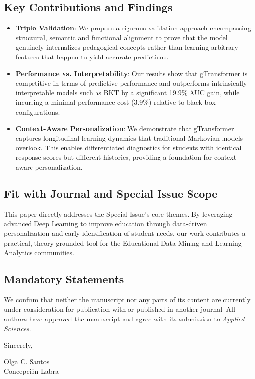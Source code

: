 \documentclass[10pt]{article}
\begin{document}
\subsection*{Key Contributions and Findings}
\begin{itemize}[leftmargin=*, label=$\bullet$, itemsep=0pt, topsep=2pt]
    \item \textbf{Triple Validation}: We propose a rigorous validation approach encompassing structural, semantic and functional alignment to prove that the model genuinely internalizes pedagogical concepts rather than learning arbitrary features that happen to yield accurate predictions.
    \item \textbf{Performance vs. Interpretability}: Our results show that gTransformer is competitive in terms of predictive performance and outperforms intrinsically interpretable models such as BKT by a significant 19.9\% AUC gain, while incurring a minimal performance cost (3.9\%) relative to black-box configurations.
    \item \textbf{Context-Aware Personalization}: We demonstrate that gTransformer captures longitudinal learning dynamics that traditional Markovian models overlook. This enables differentiated diagnostics for students with identical response scores but different histories, providing a foundation for context-aware personalization.
\end{itemize}

\subsection*{Fit with Journal and Special Issue Scope}
This paper directly addresses the Special Issue's core themes. By leveraging advanced Deep Learning to improve education through data-driven personalization and early identification of student needs, our work contributes a practical, theory-grounded tool for the Educational Data Mining and Learning Analytics communities.

\subsection*{Mandatory Statements}
We confirm that neither the manuscript nor any parts of its content are currently under consideration for publication with or published in another journal. All authors have approved the manuscript and agree with its submission to \textit{Applied Sciences}.

\vspace{0.4cm}

\noindent
Sincerely,

\vspace{0.4cm}

\noindent
Olga C. Santos \\
Concepción Labra 
\end{document}
